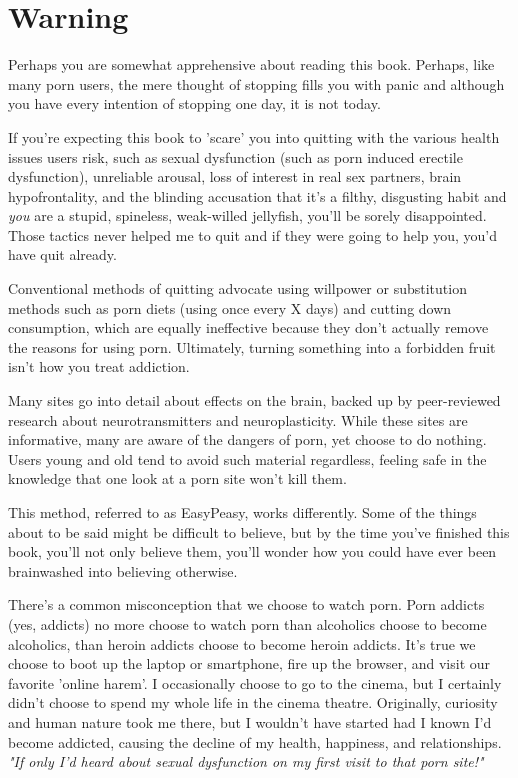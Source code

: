 \documentclass[easypeasy.tex]{subfiles}
\begin{document}
\section{Warning}
 Perhaps you are somewhat apprehensive about reading this book. Perhaps, like many porn users, the mere thought of stopping fills you with panic and although you have every intention of stopping one day, it is not today.

If you're expecting this book to 'scare' you into quitting with the various health issues users risk, such as sexual dysfunction (such as porn induced erectile dysfunction), unreliable arousal, loss of interest in real sex partners, brain hypofrontality, and the blinding accusation that it's a filthy, disgusting habit and \textit{you} are a stupid, spineless, weak-willed jellyfish, you'll be sorely disappointed. Those tactics never helped me to quit and if they were going to help you, you'd have quit already.

Conventional methods of quitting advocate using willpower or substitution methods such as porn diets (using once every X days) and cutting down consumption, which are equally ineffective because they don't actually remove the reasons for using porn. Ultimately, turning something into a forbidden fruit isn't how you treat addiction.

Many sites go into detail about effects on the brain, backed up by peer-reviewed research about neurotransmitters and neuroplasticity. While these sites are informative, many are aware of the dangers of porn, yet choose to do nothing. Users young and old tend to avoid such material regardless, feeling safe in the knowledge that one look at a porn site won't kill them.

This method, referred to as EasyPeasy, works differently. Some of the things about to be said might be difficult to believe, but by the time you've finished this book, you'll not only believe them, you'll wonder how you could have ever been brainwashed into believing otherwise.

There's a common misconception that we choose to watch porn. Porn addicts (yes, addicts) no more choose to watch porn than alcoholics choose to become alcoholics, than heroin addicts choose to become heroin addicts. It's true we choose to boot up the laptop or smartphone, fire up the browser, and visit our favorite 'online harem'. I occasionally choose to go to the cinema, but I certainly didn't choose to spend my whole life in the cinema theatre. Originally, curiosity and human nature took me there, but I wouldn't have started had I known I'd become addicted, causing the decline of my health, happiness, and relationships.
\textit{"If only I'd heard about sexual dysfunction on my first visit to that porn site!"}
\end{document}
